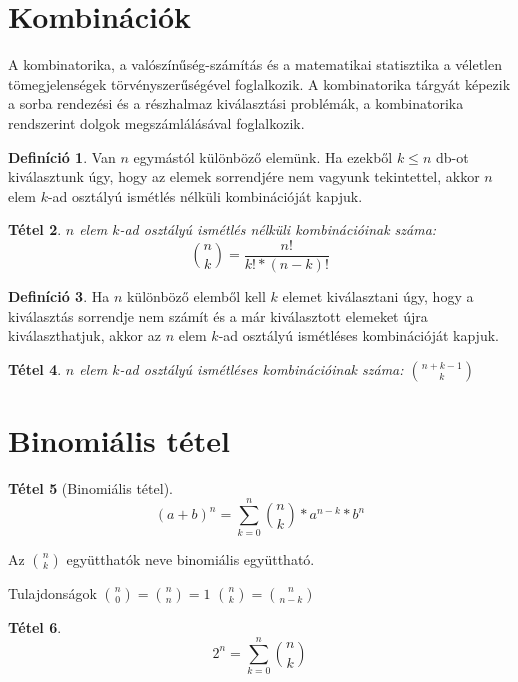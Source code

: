 \documentclass[twoside,12pt]{report}
\newtheorem{theorem}{Tétel}[section]
\theoremstyle{definition}
\newtheorem{definition}[theorem]{Definíció}
\begin{document}
\section{Kombinációk}
	A kombinatorika, a valószínűség-számítás és a matematikai statisztika a véletlen tömegjelenségek
	törvényszerűségével foglalkozik. A kombinatorika tárgyát képezik a sorba rendezési és a részhalmaz
	kiválasztási problémák, a kombinatorika rendszerint dolgok megszámlálásával foglalkozik.
	\begin{definition}
		Van $n$ egymástól különböző elemünk. Ha ezekből $k\le n$ db-ot kiválasztunk úgy, hogy az elemek sorrendjére nem vagyunk tekintettel, akkor $n$ elem $k$-ad osztályú ismétlés nélküli kombinációját kapjuk.
	\end{definition}
	\begin{theorem}
		$n$ elem $k$-ad osztályú ismétlés nélküli kombinációinak száma:
		\begin{equation*}
			\binom{n}{k}=\frac{n!}{k!*(n-k)!}
		\end{equation*}
	\end{theorem}
	\begin{definition}
		Ha $n$ különböző elemből kell $k$ elemet kiválasztani úgy, hogy a kiválasztás sorrendje nem számít és a már kiválasztott elemeket újra kiválaszthatjuk, akkor az $n$ elem $k$-ad osztályú ismétléses kombinációját kapjuk.
	\end{definition}
	\begin{theorem}
		$n$ elem $k$-ad osztályú ismétléses kombinációinak száma: $\binom{n+k-1}{k}$
	\end{theorem}
\section{Binomiális tétel}
	\begin{theorem}[Binomiális tétel]
		\begin{equation*}
			(a+b)^n=\sum_{k=0}^{n}\binom{n}{k}*a^{n-k}*b^n
		\end{equation*}
	\end{theorem}
	Az $\binom{n}{k}$ együtthatók neve binomiális együttható.
	\begin{outline}
		\1 Tulajdonságok
			\2 $\binom{n}{0}=\binom{n}{n}=1$
			\2 $\binom{n}{k}=\binom{n}{n-k}$
	\end{outline}
	\begin{theorem}
		\begin{equation*}
			2^n=\sum_{k=0}^{n}\binom{n}{k}
		\end{equation*}
	\end{theorem}
\end{document}
